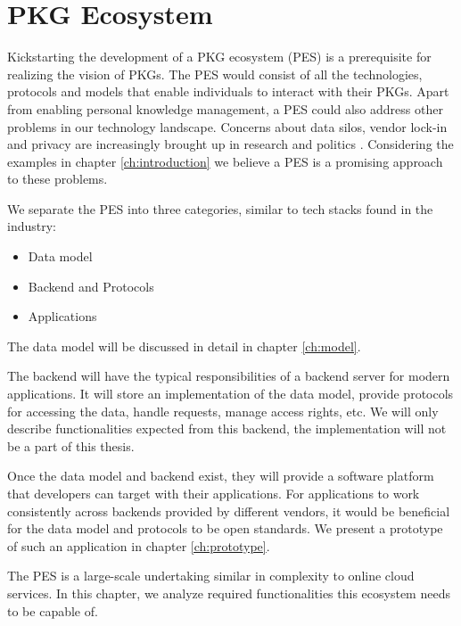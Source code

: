 \chapter{PKG Ecosystem} \label{ch:ecosystem}

Kickstarting the development of a PKG ecosystem (PES) is a prerequisite for realizing the vision of PKGs. The PES would consist of all the technologies, protocols and models that enable individuals to interact with their PKGs. Apart from enabling personal knowledge management, a PES could also address other problems in our technology landscape. Concerns about data silos, vendor lock-in and privacy are increasingly brought up in research and politics \cite{missingCitation}. Considering the examples in chapter \ref{ch:introduction} we believe a PES is a promising approach to these problems.

We separate the PES into three categories, similar to tech stacks found in the industry:

\begin{itemize}
    \item Data model
    \item Backend and Protocols
    \item Applications
\end{itemize}

The data model will be discussed in detail in chapter \ref{ch:model}.

The backend will have the typical responsibilities of a backend server for modern applications. It will store an implementation of the data model, provide protocols for accessing the data, handle requests, manage access rights, etc.
We will only describe functionalities expected from this backend, the implementation will not be a part of this thesis.

Once the data model and backend exist, they will provide a software platform that developers can target with their applications. For applications to work consistently across backends provided by different vendors, it would be beneficial for the data model and protocols to be open standards.
We present a prototype of such an application in chapter \ref{ch:prototype}.

The PES is a large-scale undertaking similar in complexity to online cloud services. In this chapter, we analyze required functionalities this ecosystem needs to be capable of.


